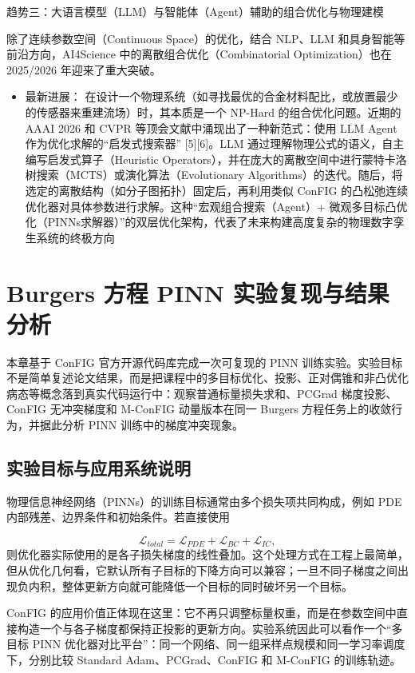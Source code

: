 \documentclass[UTF8,a4paper,12pt,fontset=none]{ctexart}
\begin{document}
趋势三：大语言模型（LLM）与智能体（Agent）辅助的组合优化与物理建模

除了连续参数空间（Continuous Space）的优化，结合 NLP、LLM 和具身智能等前沿方向，AI4Science 中的离散组合优化（Combinatorial Optimization）也在 2025/2026 年迎来了重大突破。

\begin{itemize}
\item 最新进展： 在设计一个物理系统（如寻找最优的合金材料配比，或放置最少的传感器来重建流场）时，其本质是一个 NP-Hard 的组合优化问题。近期的 AAAI 2026 和 CVPR 等顶会文献中涌现出了一种新范式：使用 LLM Agent 作为优化求解的“启发式搜索器” [5][6]。LLM 通过理解物理公式的语义，自主编写启发式算子（Heuristic Operators），并在庞大的离散空间中进行蒙特卡洛树搜索（MCTS）或演化算法（Evolutionary Algorithms）的迭代。随后，将选定的离散结构（如分子图拓扑）固定后，再利用类似 ConFIG 的凸松弛连续优化器对具体参数进行求解。这种“宏观组合搜索（Agent）+ 微观多目标凸优化（PINNs求解器）”的双层优化架构，代表了未来构建高度复杂的物理数字孪生系统的终极方向
\end{itemize}



\section{Burgers 方程 PINN 实验复现与结果分析}

本章基于 ConFIG 官方开源代码库完成一次可复现的 PINN 训练实验。实验目标不是简单复述论文结果，而是把课程中的多目标优化、投影、正对偶锥和非凸优化病态等概念落到真实代码运行中：观察普通标量损失求和、PCGrad 梯度投影、ConFIG 无冲突梯度和 M-ConFIG 动量版本在同一 Burgers 方程任务上的收敛行为，并据此分析 PINN 训练中的梯度冲突现象。


\subsection{实验目标与应用系统说明}

物理信息神经网络（PINNs）的训练目标通常由多个损失项共同构成，例如 PDE 内部残差、边界条件和初始条件。若直接使用

\[
\mathcal{L}_{total}=\mathcal{L}_{PDE}+\mathcal{L}_{BC}+\mathcal{L}_{IC},
\]
则优化器实际使用的是各子损失梯度的线性叠加。这个处理方式在工程上最简单，但从优化几何看，它默认所有子目标的下降方向可以兼容；一旦不同子梯度之间出现负内积，整体更新方向就可能降低一个目标的同时破坏另一个目标。


ConFIG 的应用价值正体现在这里：它不再只调整标量权重，而是在参数空间中直接构造一个与各子梯度都保持正投影的更新方向。实验系统因此可以看作一个“多目标 PINN 优化器对比平台”：同一个网络、同一组采样点规模和同一学习率调度下，分别比较 Standard Adam、PCGrad、ConFIG 和 M-ConFIG 的训练轨迹。
\end{document}
